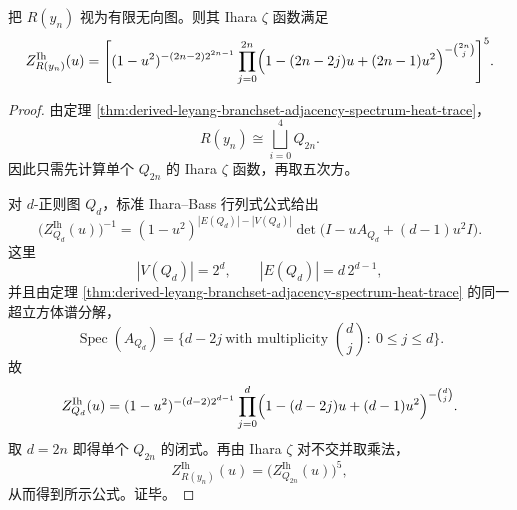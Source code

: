 \begin{theorem}\label{thm:derived-leyang-branchset-ihara-zeta}
把 \(R(y_n)\) 视为有限无向图。则其 Ihara \(\zeta\) 函数满足
\[
Z^{\mathrm{Ih}}_{R(y_n)}(u)
=
\Biggl[
(1-u^2)^{-(2n-2)2^{2n-1}}
\prod_{j=0}^{2n}
\Bigl(1-(2n-2j)u+(2n-1)u^2\Bigr)^{-\binom{2n}{j}}
\Biggr]^5.
\]
\end{theorem}

\begin{proof}
由定理 \ref{thm:derived-leyang-branchset-adjacency-spectrum-heat-trace}，
\[
R(y_n)\cong \bigsqcup_{i=0}^{4}Q_{2n}.
\]
因此只需先计算单个 \(Q_{2n}\) 的 Ihara \(\zeta\) 函数，再取五次方。

对 \(d\)-正则图 \(Q_d\)，标准 Ihara--Bass 行列式公式给出 \cite{TerrasZetaGraphs,StarkTerras1996GraphCoverings}
\[
\bigl(Z^{\mathrm{Ih}}_{Q_d}(u)\bigr)^{-1}
=
(1-u^2)^{|E(Q_d)|-|V(Q_d)|}
\det\!\bigl(I-uA_{Q_d}+(d-1)u^2I\bigr).
\]
这里
\[
|V(Q_d)|=2^d,
\qquad
|E(Q_d)|=d\,2^{d-1},
\]
并且由定理 \ref{thm:derived-leyang-branchset-adjacency-spectrum-heat-trace} 的同一超立方体谱分解，
\[
\operatorname{Spec}(A_{Q_d})
=
\bigl\{
d-2j\ \text{with multiplicity }\binom{d}{j}
:\ 0\le j\le d
\bigr\}.
\]
故
\[
Z^{\mathrm{Ih}}_{Q_d}(u)
=
(1-u^2)^{-(d-2)2^{d-1}}
\prod_{j=0}^{d}
\Bigl(1-(d-2j)u+(d-1)u^2\Bigr)^{-\binom{d}{j}}.
\]
取 \(d=2n\) 即得单个 \(Q_{2n}\) 的闭式。再由 Ihara \(\zeta\) 对不交并取乘法，
\[
Z^{\mathrm{Ih}}_{R(y_n)}(u)=\bigl(Z^{\mathrm{Ih}}_{Q_{2n}}(u)\bigr)^5,
\]
从而得到所示公式。证毕。
\end{proof}

